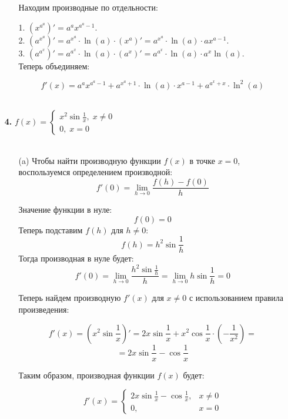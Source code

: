 \documentclass[a4paper]{article}
\renewcommand{\f}[2]{\frac{#1}{#2}}
\newcommand{\case}[1]{\begin{cases} #1 \end{cases}}
\begin{document}
\begin{enumerate}
\begin{enumerate}
        Находим производные по отдельности:

        1. $ (x^{a^a})' = a^a x^{a^a - 1} $.\\
        2. $ (a^{x^a})' = a^{x^a} \cdot \ln(a) \cdot (x^a)' = a^{x^a} \cdot \ln(a) \cdot a x^{a - 1} $.\\
        3. $ (a^{a^x})' = a^{a^x} \cdot \ln(a) \cdot (a^x)' = a^{a^x} \cdot \ln(a) \cdot a^x \ln(a) $.\\

        Теперь объединяем:

        $$
        f'(x) = a^a x^{a^a - 1} + a^{x^a+1} \cdot \ln(a) \cdot x^{a - 1} + a^{a^x + x} \cdot \ln^2(a)
        $$\\
    \end{enumerate}

    \item[\textbf{4.}]$f(x) = \case{
        x^2\sin\f{1}{x}, \; x \neq 0 \\
        0, \; x = 0
    }$\\\\
    \begin{enumerate} 
        \item[(a)]
        Чтобы найти производную функции $ f(x) $ в точке $ x = 0 $, воспользуемся определением производной:
        $$
        f'(0) = \lim_{h \to 0} \frac{f(h) - f(0)}{h}
        $$
        
        Значение функции в нуле:
        $$
        f(0) = 0
        $$
        Теперь подставим $ f(h) $ для $ h \neq 0 $:
        $$
        f(h) = h^2 \sin \frac{1}{h}
        $$
        Тогда производная в нуле будет:
        $$
        f'(0) = \lim_{h \to 0} \frac{h^2 \sin \frac{1}{h}}{h} = \lim_{h \to 0} h \sin \frac{1}{h} = 0
        $$
        
        Теперь найдем производную $ f'(x) $ для $ x \neq 0 $ с использованием правила произведения:

        $$
        f'(x) = (x^2 \sin \frac{1}{x})' = 2x \sin \frac{1}{x} + x^2 \cos \frac{1}{x} \cdot \left(-\frac{1}{x^2}\right) = 
        $$
        $$=2x \sin \frac{1}{x} - \cos \frac{1}{x}$$
        
        Таким образом, производная функции $ f(x) $ будет:

        $$
        f'(x) = \left\{\begin{array}{ll}
        2x \sin \frac{1}{x} - \cos \frac{1}{x}, & x \neq 0 \\
        0, & x = 0
        \end{array}\right.
        $$


\end{enumerate}
\end{enumerate}
\end{document}
